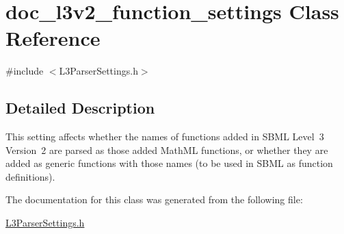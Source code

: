 \hypertarget{classdoc__l3v2__function__settings}{}\section{doc\+\_\+l3v2\+\_\+function\+\_\+settings Class Reference}
\label{classdoc__l3v2__function__settings}


{\ttfamily \#include $<$L3\+Parser\+Settings.\+h$>$}



\subsection{Detailed Description}
\begin{DoxyParagraph}{}
This setting affects whether the names of functions added in S\+B\+ML Level~3 Version~2 are parsed as those added Math\+ML functions, or whether they are added as generic functions with those names (to be used in S\+B\+ML as function definitions). 
\end{DoxyParagraph}


The documentation for this class was generated from the following file\+:\begin{DoxyCompactItemize}
\item 
\hyperlink{_l3_parser_settings_8h}{L3\+Parser\+Settings.\+h}\end{DoxyCompactItemize}
